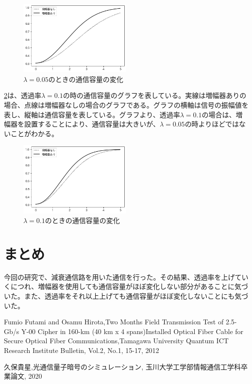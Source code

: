 \documentclass[a4j,twocolumn]{jarticle}
\def \figref #1{\figurename\ref{#1}}
\begin{document}
    \begin{figure}[H]
        \centering   
        \includegraphics[width=0.5\textwidth]{img/Fig5_1.png}
        \caption[sample image (png)]{$\lambda=0.05$のときの通信容量の変化}
        \label{Fig5_1}
    \end{figure}

\newpage
\figref{Fig5_2}は、透過率$\lambda=0.1$の時の通信容量のグラフを表している。実線は増幅器ありの場合、点線は増幅器なしの場合のグラフである。グラフの横軸は信号の振幅値を表し、縦軸は通信容量を表している。グラフより、透過率$\lambda=0.1$の場合は、増幅器を設置することにより、通信容量は大きいが、$\lambda=0.05$の時よりほどではないことがわかる。

    \begin{figure}[H]
        \centering   
        \includegraphics[width=0.5\textwidth]{img/Fig5_2.png}
        \caption[sample image (png)]{$\lambda=0.1$のときの通信容量の変化}
        \label{Fig5_2}
    \end{figure}



\section{まとめ}
今回の研究で、減衰通信路を用いた通信を行った。その結果、透過率を上げていくにつれ、増幅器を使用しても通信容量がほぼ変化しない部分があることに気づいた。また、透過率をそれ以上上げても通信容量がほぼ変化しないことにも気づいた。


\begin{thebibliography}{9}
Fumio Futami and Osamu Hirota,Two Months Field
Transmission Test of 2.5-Gb/s Y-00 Cipher in 160-km (40 km x 4
spans)Installed Optical Fiber Cable for Secure Optical Fiber Communications,Tamagawa University Quantum ICT Research Institute Bulletin, Vol.2, No.1, 15-17, 2012 

久保貴星,光通信量子暗号のシミュレーション, 玉川大学工学部情報通信工学科卒業論文, 2020 
\end{thebibliography}
\end{document}
